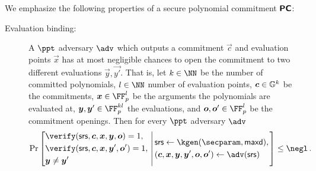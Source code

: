 \documentclass[runningheads,11pt]{llncs}
\begin{document}
We emphasize the following properties of a secure polynomial commitment
$\bm{\mathsf{PC}}$:
\begin{description}
\item[Evaluation binding:] A $\ppt$ adversary $\adv$ which outputs a commitment
  $\vec{c}$ and evaluation points $\vec{x}$ has at most negligible chances to
  open the commitment to two different evaluations $\vec{y}, \vec{y'}$. That is,
  let $k \in \NN$ be the number of committed polynomials, $l \in \NN$ number of
  evaluation points, $\vec{c} \in \GRP^k$ be the commitments,
  $\vec{x} \in \FF_p^l$ be the arguments the polynomials are evaluated at,
  $\vec{y},\vec{y}' \in \FF_p^{kl}$ the evaluations, and
  $\vec{o},\vec{o}' \in \FF_p^l$ be the commitment openings. Then for every
  $\ppt$ adversary $\adv$
	\[
		\Pr
			\left[
			\begin{aligned}
				& \verify(\srs, \vec{c}, \vec{x}, \vec{y}, \vec{o}) = 1,  \\
				& \verify(\srs, \vec{c}, \vec{x}, \vec{y}', \vec{o}') = 1, \\
				& \vec{y} \neq \vec{y}'
			\end{aligned}
			\,\left|\,\vphantom{\begin{aligned}
                  & \\
                  & \\
                  &
                \end{aligned}}
			\begin{aligned}
				& \srs \gets \kgen(\secparam, \maxdeg),\\
				& (\vec{c}, \vec{x}, \vec{y}, \vec{y}', \vec{o}, \vec{o}') \gets \adv(\srs)
			\end{aligned}
			\right.\right] \leq \negl\,.
	\]

\end{description}
	
\end{document}
